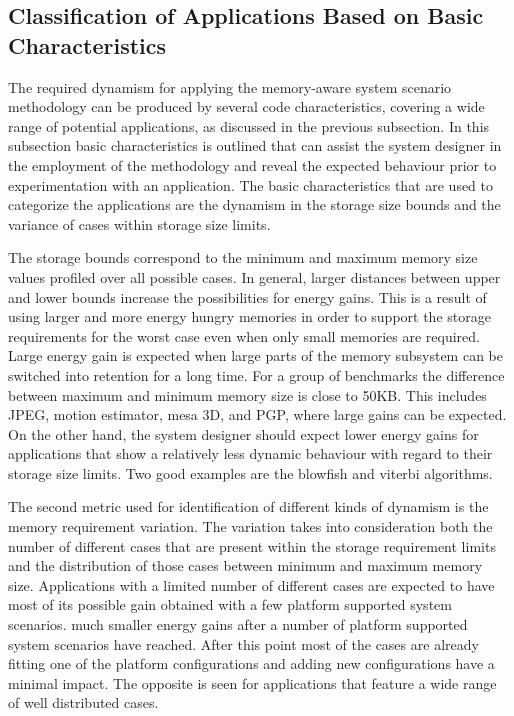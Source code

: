 \documentclass{acm_proc_article-sp}
\begin{document}
\subsection{Classification of Applications Based on Basic Characteristics}
\label{sec:categorisation}
The required dynamism for applying the memory-aware system scenario methodology can be produced by several code characteristics, covering a wide range of potential applications, as discussed in the previous subsection. In this subsection basic characteristics is outlined that can assist the system designer in the employment of the methodology and reveal the expected behaviour prior to experimentation with an application. The basic characteristics that are used to categorize the applications are the dynamism in the storage size bounds and the variance of cases within storage size limits.

The storage bounds correspond to the minimum and maximum memory size values profiled over all possible cases. In general, larger distances between upper and lower bounds increase the possibilities for energy gains. This is a result of using larger and more energy hungry memories in order to support the storage requirements for the worst case even when only small memories are required. Large energy gain is expected when large parts of the memory subsystem can be switched into retention for a long time. For a group of benchmarks the difference between maximum and minimum memory size is close to 50KB. This includes JPEG, motion estimator, mesa 3D, and PGP, where large gains can be expected. On the other hand, the system designer should expect lower energy gains for applications that show a relatively less dynamic behaviour with regard to their storage size limits. Two good examples are the blowfish and viterbi algorithms. 

The second metric used for identification of different kinds of dynamism is the memory requirement variation. The variation takes into consideration both the number of different cases that are present within the storage requirement limits and the distribution of those cases between minimum and maximum memory size. Applications with a limited number of different cases are expected to have most of its possible gain obtained with a few platform supported system scenarios. much smaller energy gains after a number of platform supported system scenarios have reached. After this point most of the cases are already fitting one of the platform configurations and adding new configurations have a minimal impact. The opposite is seen for applications that feature a wide range of well distributed cases.
\end{document}
